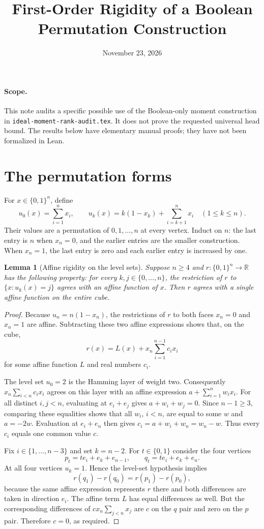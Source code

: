 \documentclass[11pt]{article}
\title{First-Order Rigidity of a Boolean Permutation Construction}
\author{}
\date{November 23, 2026}
\newtheorem{lemma}[theorem]{Lemma}
\begin{document}
\maketitle

\paragraph{Scope.}
This note audits a specific possible use of the Boolean-only moment
construction in \texttt{ideal-moment-rank-audit.tex}. It does not prove
the requested universal head bound. The results below have elementary
manual proofs; they have not been formalized in Lean.

\section{The permutation forms}

For $x\in\{0,1\}^n$, define
\[
 u_0(x)=\sum_{i=1}^n x_i,\qquad
 u_k(x)=k(1-x_k)+\sum_{i=k+1}^n x_i\quad(1\le k\le n).
\]
Their values are a permutation of $0,1,\ldots,n$ at every vertex.
Induct on $n$: the last entry is $n$ when $x_n=0$, and the earlier
entries are the smaller construction. When $x_n=1$, the last entry
is zero and each earlier entry is increased by one.

\begin{lemma}[Affine rigidity on the level sets]
Suppose $n\ge4$ and $r:\{0,1\}^n\to\mathbb R$ has the following
property: for every $k,j\in\{0,\ldots,n\}$, the restriction of $r$
to $\{x:u_k(x)=j\}$ agrees with an affine function of $x$.
Then $r$ agrees with a single affine function on the entire cube.
\end{lemma}
\begin{proof}
Because $u_n=n(1-x_n)$, the restrictions of $r$ to both faces
$x_n=0$ and $x_n=1$ are affine. Subtracting these two affine
expressions shows that, on the cube,
\[
 r(x)=L(x)+x_n\sum_{i=1}^{n-1}c_i x_i
\]
for some affine function $L$ and real numbers $c_i$.

The level set $u_0=2$ is the Hamming layer of weight two. Consequently
$x_n\sum_{i<n}c_i x_i$ agrees on this layer with an affine expression
$a+\sum_{i=1}^n w_i x_i$. For all distinct $i,j<n$, evaluating at
$e_i+e_j$ gives $a+w_i+w_j=0$. Since $n-1\ge3$, comparing these
equalities shows that all $w_i$, $i<n$, are equal to some $w$ and
$a=-2w$. Evaluation at $e_i+e_n$ then gives
$c_i=a+w_i+w_n=w_n-w$. Thus every $c_i$ equals one common value $c$.

Fix $i\in\{1,\ldots,n-3\}$ and set $k=n-2$. For $t\in\{0,1\}$
consider the four vertices
\[
 p_t=t e_i+e_k+e_{n-1},\qquad
 q_t=t e_i+e_k+e_n.
\]
At all four vertices $u_k=1$. Hence the level-set hypothesis implies
\[
 r(q_1)-r(q_0)=r(p_1)-r(p_0),
\]
because the same affine expression represents $r$ there and both
differences are taken in direction $e_i$.
The affine term $L$ has equal differences as well. But the corresponding
differences of $c x_n\sum_{j<n}x_j$ are $c$ on the $q$ pair and zero
on the $p$ pair. Therefore $c=0$, as required.
\end{proof}
\end{document}
